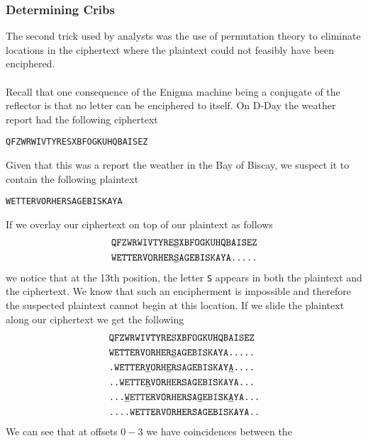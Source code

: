 \subsubsection{Determining Cribs}
The second trick used by analysts was the use of permutation theory to
eliminate locations in the ciphertext where the plaintext could not
feasibly have been enciphered.
\\\\Recall that one consequence of the Enigma machine being a
conjugate of the reflector is that no letter can be enciphered to
itself. On D-Day the weather report had the following ciphertext
\begin{center}
  \texttt{QFZWRWIVTYRESXBFOGKUHQBAISEZ}
\end{center}
Given that this was a report the weather in the Bay of Biscay, we
suspect it to contain the following plaintext
\begin{center}
  \texttt{WETTERVORHERSAGEBISKAYA}
\end{center}
If we overlay our ciphertext on top of our plaintext as follows
\begin{align*}
  & \texttt{QFZWRWIVTYRE}{\uline{\texttt{S}}}\texttt{XBFOGKUHQBAISEZ} \\
  & \texttt{WETTERVORHER}{\uline{\texttt{S}}}\texttt{AGEBISKAYA.....}
\end{align*}
we notice that at the 13th position, the letter \texttt{S} appears in
both the plaintext and the ciphertext. We know that such an
encipherment is impossible and therefore the suspected plaintext
cannot begin at this location. If we slide the plaintext along our
ciphertext we get the following
\begin{align*}
  & \texttt{QFZWRWIVTYRESXBFOGKUHQBAISEZ}
  \\
  & \texttt{WETTERVORHER}{\uline{\texttt{S}}}\texttt{AGEBISKAYA.....}
  \\
  &
  \texttt{.WETTER}{\uline{\texttt{V}}}\texttt{ORH}{\uline{\texttt{E}}}\texttt{RSAGEBISKAY}{\uline{\texttt{A}}}\texttt{....}
  \\
  & \texttt{..WETTE}{\uline{\texttt{R}}}\texttt{VORHERSAGEBISKAYA...}
  \\
  &
  \texttt{...}{\uline{\texttt{W}}}\texttt{ETTERVORHERSA}{\uline{\texttt{G}}}\texttt{EBISK}{\uline{\texttt{A}}}\texttt{YA...}
  \\
  & \texttt{....WETTERVORHERSAGEBISKAYA..}
  \\
\end{align*}
We can see that at offsets $0-3$ we have coincidences between the
